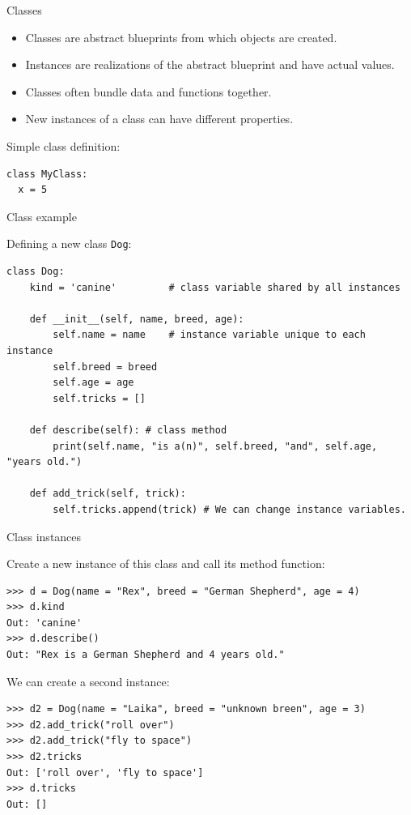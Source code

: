 \documentclass[compress%
,aspectratio=169%
]{beamer}
\newcommand{\code}{\lstinline}
\begin{document}
\begin{frame}[fragile]{Classes}

\begin{itemize}
    \item Classes are abstract blueprints from which objects are created.
    \item Instances are realizations of the abstract blueprint and have actual values.
    \item Classes often bundle data and functions together.
    \item New instances of a class can have different properties.
\end{itemize}
Simple class definition:

\begin{lstlisting}
class MyClass:
  x = 5

\end{lstlisting}
\end{frame}

\begin{frame}[fragile]{Class example}

Defining a new class \code|Dog|:
\begin{lstlisting}
class Dog:
    kind = 'canine'         # class variable shared by all instances

    def __init__(self, name, breed, age):
        self.name = name    # instance variable unique to each instance
        self.breed = breed
        self.age = age
        self.tricks = []
        
    def describe(self): # class method
        print(self.name, "is a(n)", self.breed, "and", self.age, "years old.")

    def add_trick(self, trick):
        self.tricks.append(trick) # We can change instance variables.
\end{lstlisting}
\end{frame}

\begin{frame}[fragile]{Class instances}
    
Create a new instance of this class and call its method function:
\begin{lstlisting}
>>> d = Dog(name = "Rex", breed = "German Shepherd", age = 4)
>>> d.kind
Out: 'canine'
>>> d.describe()
Out: "Rex is a German Shepherd and 4 years old."
\end{lstlisting}
We can create a second instance:

\begin{lstlisting}
>>> d2 = Dog(name = "Laika", breed = "unknown breen", age = 3)
>>> d2.add_trick("roll over")
>>> d2.add_trick("fly to space")
>>> d2.tricks
Out: ['roll over', 'fly to space']
>>> d.tricks
Out: [] 
\end{lstlisting}

\end{frame}
\end{document}
